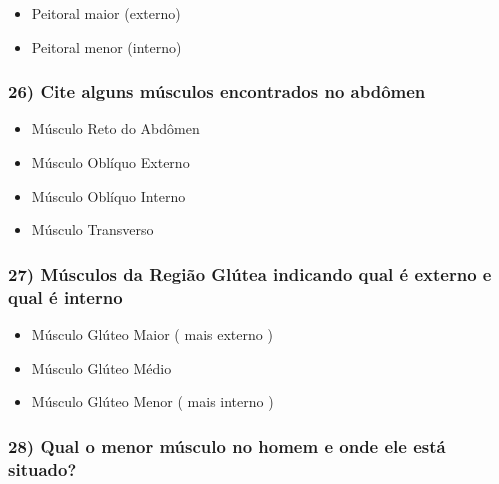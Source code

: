 \documentclass[
]{book}
\providecommand{\tightlist}{%
  \setlength{\itemsep}{0pt}\setlength{\parskip}{0pt}}
\begin{document}
\begin{itemize}
\tightlist
\item
  Peitoral maior (externo)
\item
  Peitoral menor (interno)
\end{itemize}

\hypertarget{cite-alguns-muxfasculos-encontrados-no-abduxf4men}{%
\subsubsection*{26) Cite alguns músculos encontrados no abdômen}\label{cite-alguns-muxfasculos-encontrados-no-abduxf4men}}

\begin{itemize}
\tightlist
\item
  Músculo Reto do Abdômen
\item
  Músculo Oblíquo Externo
\item
  Músculo Oblíquo Interno
\item
  Músculo Transverso
\end{itemize}

\hypertarget{muxfasculos-da-regiuxe3o-gluxfatea-indicando-qual-uxe9-externo-e-qual-uxe9-interno}{%
\subsubsection*{27) Músculos da Região Glútea indicando qual é externo e qual é interno}\label{muxfasculos-da-regiuxe3o-gluxfatea-indicando-qual-uxe9-externo-e-qual-uxe9-interno}}

\begin{itemize}
\tightlist
\item
  Músculo Glúteo Maior ( mais externo )
\item
  Músculo Glúteo Médio
\item
  Músculo Glúteo Menor ( mais interno )
\end{itemize}

\hypertarget{qual-o-menor-muxfasculo-no-homem-e-onde-ele-estuxe1-situado}{%
\subsubsection*{28) Qual o menor músculo no homem e onde ele está situado?}\label{qual-o-menor-muxfasculo-no-homem-e-onde-ele-estuxe1-situado}}
\end{document}
